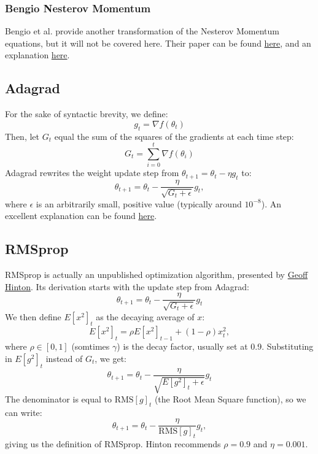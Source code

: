 \documentclass[fleqn]{article}
\begin{document}
\subsubsection{Bengio Nesterov Momentum}
Bengio et al. provide another transformation of the Nesterov Momentum
equations, but it will not be covered here. Their paper can be found
\href{https://arxiv.org/pdf/1212.0901.pdf}{here}, and an explanation
\href{https://jlmelville.github.io/mize/nesterov.html#bengio_nesterov_momentum}
{here}.

\subsection{Adagrad}
For the sake of syntactic brevity, we define:
\[ g_t = \nabla f(\theta_t) \]
Then, let $G_t$ equal the sum of the squares of the gradients at each time
step:
\[ G_t = \sum_{i=0}^t \nabla f(\theta_i) \]
Adagrad rewrites the weight update step from
$\theta_{t+1} = \theta_t - \eta g_t$ to:
\[ \theta_{t+1} = \theta_t - \frac{\eta}{\sqrt{G_t + \epsilon}} g_t, \]
where $\epsilon$ is an arbitrarily small, positive value (typically around
$10^{-8}$). An excellent explanation can be found
\href{http://ruder.io/optimizing-gradient-descent/index.html#adagrad}
{here}.

\subsection{RMSprop}
RMSprop is actually an unpublished optimization algorithm, presented by
\href{http://www.cs.toronto.edu/~tijmen/csc321/slides/lecture_slides_lec6.pdf}
{Geoff Hinton}. Its derivation starts with the update step from Adagrad:
\[ \theta_{t+1} = \theta_t - \frac{\eta}{\sqrt{G_t + \epsilon}} g_t \]
We then define $E[x^2]_t$ as the decaying average of $x$:
\[ E[x^2]_t = \rho E[x^2]_{t-1} + (1 - \rho)x_t^2, \]
where $\rho \in [0, 1]$ (somtimes $\gamma$) is the decay factor, usually
set at 0.9. Substituting in $E[g^2]_t$ instead of $G_t$, we get:
\[ \theta_{t+1} = \theta_t - \frac{\eta}{\sqrt{E[g^2]_t + \epsilon}} g_t \]
The denominator is equal to $\text{RMS}[g]_t$ (the Root Mean Square
function), so we can write:
\[ \theta_{t+1} = \theta_t - \frac{\eta}{\text{RMS}[g]_t} g_t, \]
giving us the definition of RMSprop. Hinton recommends $\rho=0.9$ and
$\eta=0.001$.
\end{document}
